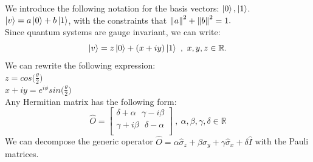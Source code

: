 \documentclass{article}
\begin{document}
We introduce the following notation for the basis vectors: $\ket{0}, \ket{1}$.
$\ket{v} = a\ket{0}+b\ket{1} $, with the constraints that $\norm{a}^2+\norm{b}^2=1.$\\
Since quantum systems are gauge invariant, we can write:
$$ \ket{v} = z\ket{0}+ (x+iy) \ket{1} \ , \ x,y,z \in \mathbb{R}.$$
We can rewrite the following expression: \\
$ z = cos \bigl( \frac{\theta}{2} \bigl) $\\
$ x +iy = e^{i\phi}sin\bigl( \frac{\theta}{2} \bigl)$
\\
Any Hermitian matrix has the following form:
$$\hat{O} = \begin{bmatrix}
    \delta +\alpha \ \ \  \gamma-i\beta \\
    \gamma + i\beta \ \ \  \delta - \alpha \\ 
\end{bmatrix} \ , \ \alpha,\beta,\gamma, \delta \in \mathbb{R}$$
We can decompose the generic operator $\hat{O} = \alpha \hat{\sigma}_z + \beta \hat{\sigma}_y + \gamma \hat{\sigma}_x + \delta \hat{I} $ with the Pauli matrices.
\end{document}

